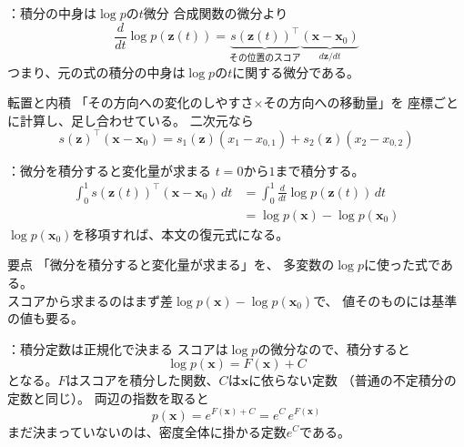 \assuppl
\begin{frame}{\supplmark：積分の中身は$\log p$の$t$微分}
    合成関数の微分より
    \[
        \frac{d}{dt}\log p(\bm{z}(t))
        =
        \underbrace{s(\bm{z}(t))^{\top}}_{\text{その位置のスコア}}
        \underbrace{(\bm{x}-\bm{x}_0)}_{d\bm{z}/dt}
    \]
    つまり、元の式の積分の中身は$\log p$の$t$に関する微分である。
    \begin{exampleblock}{転置と内積}
        「その方向への変化のしやすさ$\times$その方向への移動量」を
        座標ごとに計算し、足し合わせている。
        二次元なら
        \[
            s(\bm{z})^{\top}(\bm{x}-\bm{x}_0)
            =
            s_1(\bm{z})(x_1-x_{0,1})
            +
            s_2(\bm{z})(x_2-x_{0,2})
        \]
    \end{exampleblock}
\end{frame}
\assuppl
\begin{frame}{\supplmark：微分を積分すると変化量が求まる}
    $t=0$から$1$まで積分する。
    \begin{align*}
        \int_0^1
        s(\bm{z}(t))^{\top}(\bm{x}-\bm{x}_0)\,dt
        &=
        \int_0^1\frac{d}{dt}\log p(\bm{z}(t))\,dt\\
        &=
        \log p(\bm{x})-\log p(\bm{x}_0)
    \end{align*}
    $\log p(\bm{x}_0)$を移項すれば、本文の復元式になる。
    \begin{exampleblock}{要点}
        「微分を積分すると変化量が求まる」を、
        多変数の$\log p$に使った式である。\\
        スコアから求まるのはまず差$\log p(\bm{x})-\log p(\bm{x}_0)$で、
        値そのものには基準の値も要る。
    \end{exampleblock}
\end{frame}
\assuppl
\begin{frame}{\supplmark：積分定数は正規化で決まる}
    スコアは$\log p$の微分なので、積分すると
    \[
        \log p(\bm{x})=F(\bm{x})+C
    \]
    となる。$F$はスコアを積分した関数、$C$は$\bm{x}$に依らない定数
    （普通の不定積分の定数と同じ）。
    両辺の指数を取ると
    \[
        p(\bm{x})=e^{F(\bm{x})+C}=e^{C}\,e^{F(\bm{x})}
    \]
    まだ決まっていないのは、密度全体に掛かる定数$e^{C}$である。
\end{frame}
\assuppl
